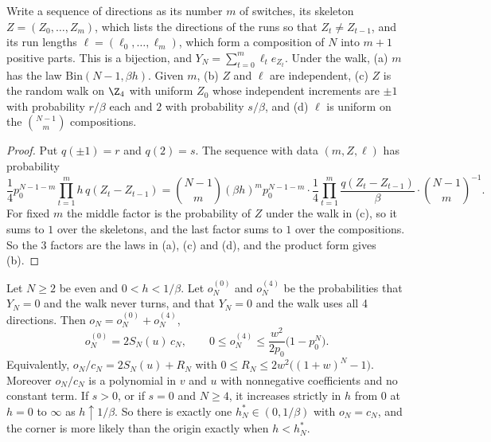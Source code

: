 \begin{lemma}\label{lem:threelevel}
Write a sequence of directions as its number $m$ of switches, its skeleton $Z=(Z_0,\dots,Z_m)$,
which lists the directions of the runs so that $Z_t\ne Z_{t-1}$, and its run lengths
$\ell=(\ell_0,\dots,\ell_m)$, which form a composition of $N$ into $m+1$ positive parts. This is a
bijection, and $Y_N=\sum_{t=0}^m\ell_te_{Z_t}$. Under the walk, \textup{(a)} $m$ has the law
$\mathrm{Bin}(N-1,\beta h)$. Given $m$, \textup{(b)} $Z$ and $\ell$ are independent, \textup{(c)}
$Z$ is the random walk on $\Z_4$ with uniform $Z_0$ whose independent increments are $\pm1$ with
probability $r/\beta$ each and $2$ with probability $s/\beta$, and \textup{(d)} $\ell$ is uniform on
the $\binom{N-1}m$ compositions.
\end{lemma}

\begin{proof}
Put $q(\pm1)=r$ and $q(2)=s$. The sequence with data $(m,Z,\ell)$ has probability
\[
 \frac14p_0^{N-1-m}\prod_{t=1}^mh\,q(Z_t-Z_{t-1})
 =\binom{N-1}m(\beta h)^mp_0^{N-1-m}\cdot\frac14\prod_{t=1}^m\frac{q(Z_t-Z_{t-1})}\beta
 \cdot\binom{N-1}m^{-1}.
\]
For fixed $m$ the middle factor is the probability of $Z$ under the walk in (c), so it sums to $1$
over the skeletons, and the last factor sums to $1$ over the compositions. So the 3 factors are the
laws in (a), (c) and (d), and the product form gives (b).
\end{proof}

\begin{proposition}\label{prop:decomp}
Let $N\ge2$ be even and $0<h<1/\beta$. Let $o^{(0)}_N$ and $o^{(4)}_N$ be the probabilities that
$Y_N=0$ and the walk never turns, and that $Y_N=0$ and the walk uses all 4 directions. Then
$o_N=o^{(0)}_N+o^{(4)}_N$,
\[
 o^{(0)}_N=2S_N(u)\,c_N,\qquad 0\le o^{(4)}_N\le\frac{w^2}{2p_0}\bigl(1-p_0^N\bigr).
\]
Equivalently, $o_N/c_N=2S_N(u)+R_N$ with $0\le R_N\le2w^2\bigl((1+w)^N-1\bigr)$. Moreover $o_N/c_N$
is a polynomial in $v$ and $u$ with nonnegative coefficients and no constant term. If $s>0$, or if
$s=0$ and $N\ge4$, it increases strictly in $h$ from $0$ at $h=0$ to $\infty$ as $h\uparrow1/\beta$.
So there is exactly one $h^*_N\in(0,1/\beta)$ with $o_N=c_N$, and the corner is more likely than the
origin exactly when $h<h^*_N$.
\end{proposition}

